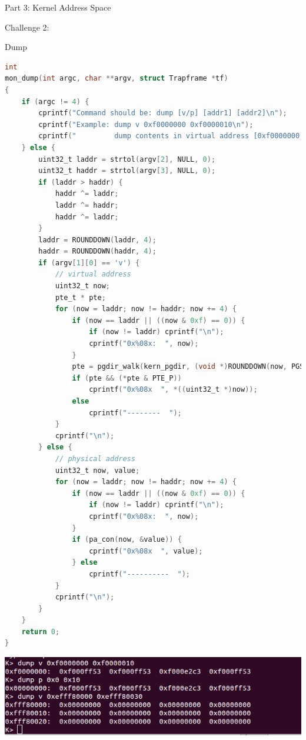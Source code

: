 \documentclass[GBK,winfonts,a4paper,10pt]{ctexart}
\begin{document}
\begin{section}{Part 3: Kernel Address Space}
\begin{subsection}{Challenge 2:}
\begin{subsubsection}{ Dump }
\begin{lstlisting}[language=C]
int
mon_dump(int argc, char **argv, struct Trapframe *tf)
{
    if (argc != 4) {
        cprintf("Command should be: dump [v/p] [addr1] [addr2]\n");
        cprintf("Example: dump v 0xf0000000 0xf0000010\n");
        cprintf("         dump contents in virtual address [0xf0000000, 0xf0000010)\n");
    } else {
        uint32_t laddr = strtol(argv[2], NULL, 0);
        uint32_t haddr = strtol(argv[3], NULL, 0);
        if (laddr > haddr) {
            haddr ^= laddr;
            laddr ^= haddr;
            haddr ^= laddr;
        }
        laddr = ROUNDDOWN(laddr, 4);
        haddr = ROUNDDOWN(haddr, 4);
        if (argv[1][0] == 'v') {
            // virtual address
            uint32_t now;
            pte_t * pte;
            for (now = laddr; now != haddr; now += 4) {
                if (now == laddr || ((now & 0xf) == 0)) {
                    if (now != laddr) cprintf("\n"); 
                    cprintf("0x%08x:  ", now);
                }
                pte = pgdir_walk(kern_pgdir, (void *)ROUNDDOWN(now, PGSIZE), 0);
                if (pte && (*pte & PTE_P)) 
                    cprintf("0x%08x  ", *((uint32_t *)now));
                else
                    cprintf("--------  ");
            }
            cprintf("\n");
        } else {
            // physical address
            uint32_t now, value;
            for (now = laddr; now != haddr; now += 4) {
                if (now == laddr || ((now & 0xf) == 0)) {
                    if (now != laddr) cprintf("\n");
                    cprintf("0x%08x:  ", now);
                }
                if (pa_con(now, &value)) {
                    cprintf("0x%08x  ", value);
                } else
                    cprintf("----------  ");
            }
            cprintf("\n");
        }
    }
    return 0;
}
\end{lstlisting}
\includegraphics[scale=0.5]{dump.png}
\end{subsubsection}


\end{subsection}
\end{section}
\end{document}
